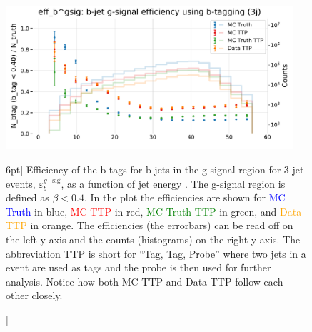 \documentclass[a4paper, twoside]{tufte-book}
\newcommand{\code}[1]{\colorbox{light-gray}{\texttt{\detokenize{#1}}}}
\newcommand{\q}[1]{``#1''}
\begin{document}
\begin{figure}
  \includegraphics[width=0.95\textwidth, trim=0 0 0 40, clip]{figures/quarks/eff_b_gsig-down_sample=1.00-ML_vars=vertex-selection=b-ejet_min=4-n_iter_RS_lgb=99-n_iter_RS_xgb=9-cdot_cut=0.90-version=19.pdf}
  \caption[b-Tagging Efficiency $\varepsilon_b^{g\mathrm{-sig}}$ as a function of jet energy][6pt]
          {Efficiency of the b-tags for b-jets in the g-signal region for 3-jet events, $\varepsilon_b^{g\mathrm{-sig}}$, as a function of jet energy \code{Ejet}. The g-signal region is defined as $\beta < 0.4$. In the plot the efficiencies are shown for \textcolor{blue}{MC Truth} in blue, \textcolor{red}{MC TTP} in red, \textcolor{green}{MC Truth TTP} in green, and \textcolor{orange}{Data TTP} in orange. The efficiencies (the errorbars) can be read off on the left y-axis and the counts (histograms) on the right y-axis. The abbreviation TTP is short for \q{Tag, Tag, Probe} where two jets in a event are used as tags and the probe is then used for further analysis. Notice how both MC TTP and Data TTP follow each other closely.  
          } 
  \label{fig:q:effiency_btag_bjet_gsig}
\end{figure}
\end{document}
